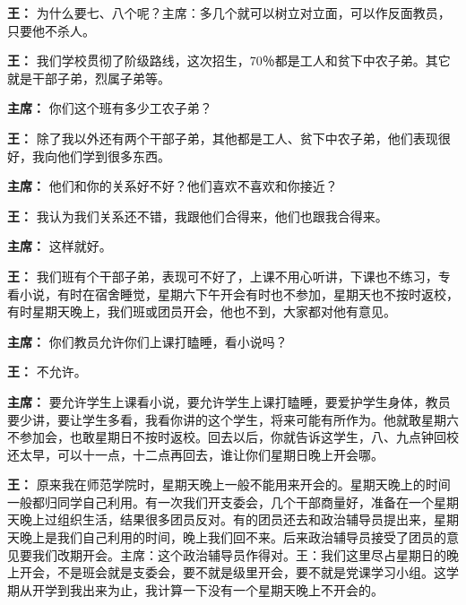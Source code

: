 \begin{duihua}
\item[\textbf{王：}] 为什么要七、八个呢？主席：多几个就可以树立对立面，可以作反面教员，只要他不杀人。

\item[\textbf{王：}] 我们学校贯彻了阶级路线，这次招生，70％都是工人和贫下中农子弟。其它就是干部子弟，烈属子弟等。

\item[\textbf{主席：}] 你们这个班有多少工农子弟？

\item[\textbf{王：}] 除了我以外还有两个干部子弟，其他都是工人、贫下中农子弟，他们表现很好，我向他们学到很多东西。

\item[\textbf{主席：}] 他们和你的关系好不好？他们喜欢不喜欢和你接近？

\item[\textbf{王：}] 我认为我们关系还不错，我跟他们合得来，他们也跟我合得来。

\item[\textbf{主席：}] 这样就好。

\item[\textbf{王：}] 我们班有个干部子弟，表现可不好了，上课不用心听讲，下课也不练习，专看小说，有时在宿舍睡觉，星期六下午开会有时也不参加，星期天也不按时返校，有时星期天晚上，我们班或团员开会，他也不到，大家都对他有意见。

\item[\textbf{主席：}] 你们教员允许你们上课打瞌睡，看小说吗？

\item[\textbf{王：}] 不允许。

\item[\textbf{主席：}] 要允许学生上课看小说，要允许学生上课打瞌睡，要爱护学生身体，教员要少讲，要让学生多看，我看你讲的这个学生，将来可能有所作为。他就敢星期六不参加会，也敢星期日不按时返校。回去以后，你就告诉这学生，八、九点钟回校还太早，可以十一点，十二点再回去，谁让你们星期日晚上开会哪。

\item[\textbf{王：}] 原来我在师范学院时，星期天晚上一般不能用来开会的。星期天晚上的时间一般都归同学自己利用。有一次我们开支委会，几个干部商量好，准备在一个星期天晚上过组织生活，结果很多团员反对。有的团员还去和政治辅导员提出来，星期天晚上是我们自己利用的时间，晚上我们回不来。后来政治辅导员接受了团员的意见要我们改期开会。主席：这个政治辅导员作得对。王：我们这里尽占星期日的晚上开会，不是班会就是支委会，要不就是级里开会，要不就是党课学习小组。这学期从开学到我出来为止，我计算一下没有一个星期天晚上不开会的。


\end{duihua}
